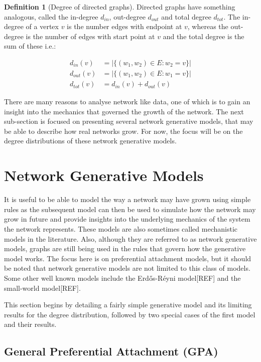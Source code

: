 \documentclass[
  10pt,
  a4paper,
]{scrreprt}
\theoremstyle{plain}
\theoremstyle{definition}
\newtheorem{definition}{Definition}[section]
\theoremstyle{plain}
\theoremstyle{remark}
\begin{document}
{\begin{definition}[Degree of directed
graphs]
Directed graphs have something analogous, called the in-degree
\(d_{in}\), out-degree \(d_{out}\) and total degree \(d_{tot}\). The
in-degree of a vertex \(v\) is the number edges with endpoint at \(v\),
whereas the out-degree is the number of edges with start point at \(v\)
and the total degree is the sum of these i.e.:

\begin{align*}
d_{in}(v)&= |\{(w_1,w_2)\in E: w_2=v \}|\\
d_{out}(v) &= |\{(w_1,w_2)\in E: w_1=v \}|\\
d_{tot}(v) &= d_{in}(v) + d_{out}(v)
\end{align*}

\end{definition}

There are many reasons to analyse network like data, one of which is to
gain an insight into the mechanics that governed the growth of the
network. The next sub-section is focused on presenting several network
generative models, that may be able to describe how real networks grow.
For now, the focus will be on the degree distributions of these network
generative models.

\hypertarget{sec-gen}{%
\section{Network Generative Models}\label{sec-gen}}

It is useful to be able to model the way a network may have grown using
simple rules as the subsequent model can then be used to simulate how
the network may grow in future and provide insights into the underlying
mechanics of the system the network represents. These models are also
sometimes called mechanistic models in the literature. Also, although
they are referred to as network generative models, graphs are still
being used in the rules that govern how the generative model works. The
focus here is on preferential attachment models, but it should be noted
that network generative models are not limited to this class of models.
Some other well known models include the Erdős-Réyni model{[}REF{]} and
the small-world model{[}REF{]}.

This section begins by detailing a fairly simple generative model and
its limiting results for the degree distribution, followed by two
special cases of the first model and their results.

\hypertarget{general-preferential-attachment-gpa}{%
\subsection{General Preferential Attachment
(GPA)}\label{general-preferential-attachment-gpa}}

}
\end{document}
